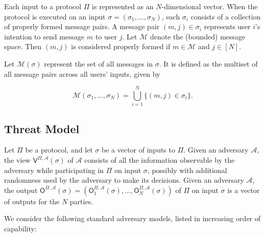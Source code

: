 Each input to a protocol $\Pi$ is represented as an $N$-dimensional vector. When the protocol is executed on an input $\sigma = (\sigma_1, \dots, \sigma_N)$, each $\sigma_i$ consists of a collection of properly formed message pairs. A message pair $(m,j) \in \sigma_i$ represents user $i$'s intention to send message $m$ to user $j$. Let $\mathcal{M}$ denote the (bounded) message space. Then $(m,j)$ is considered properly formed if $m \in \mathcal{M}$ and $j \in [N]$. 

Let $\mathcal{M}(\sigma)$ represent the set of all messages in $\sigma$. It is defined as the multiset of all message pairs across all users' inputs, given by

$$
\mathcal{M}(\sigma_1, \dots, \sigma_N) = \bigcup_{i=1}^{N} \{ (m,j) \in \sigma_i \}.
$$

\subsection{Threat Model}

Let $\Pi$ be a protocol, and let $\sigma$ be a vector of inputs to $\Pi$. Given an adversary $\mathcal{A}$, the view $\mathsf{V}^{\Pi,\mathcal{A}}(\sigma)$ of $\mathcal{A}$ consists of all the information observable by the adversary while participating in $\Pi$ on input $\sigma$, possibly with additional randomness used by the adversary to make its decisions. Given an adversary $\mathcal{A}$, the output $\mathsf{O}^{\Pi,\mathcal{A}}(\sigma) = (\mathsf{O}^{\Pi,\mathcal{A}}_1(\sigma), \dots, \mathsf{O}^{\Pi,\mathcal{A}}_N(\sigma))$ of $\Pi$ on input $\sigma$ is a vector of outputs for the $N$ parties.

We consider the following standard adversary models, listed in increasing order of capability:

